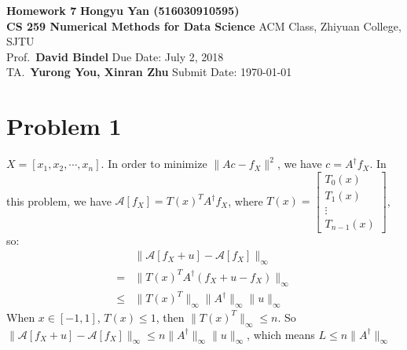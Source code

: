 \documentclass[a4paper, 11pt]{article}
\begin{document}
\noindent
\large\textbf{Homework 7} \hfill \textbf{Hongyu Yan (516030910595)} \\
\normalsize {\bf CS 259 Numerical Methods for Data Science} \hfill ACM Class, Zhiyuan College, SJTU\\
Prof.~{\bf David Bindel} \hfill Due Date: July 2, 2018\\
TA.~{\bf Yurong You, Xinran Zhu} \hfill Submit Date: \today

\section*{Problem 1}
$X = [x_1, x_2, \cdots, x_n]$. In order to minimize $\|Ac-f_X\|^2$,
we have $c=A^{\dagger}f_X$. In this problem, we have $\mathcal{A}[f_X]=T(x)^TA^{\dagger}f_X$, where $T(x) = \begin{bmatrix}
T_0(x) \\
T_1(x) \\
\vdots \\
T_{n-1}(x)
\end{bmatrix}$, so:
\begin{align*}
& \|\mathcal{A}[f_X+u]-\mathcal{A}[f_X]\|_{\infty} \\
= &\|T(x)^TA^{\dagger}(f_X+u-f_X)\|_{\infty} \\
\leq & \| T(x)^T\|_{\infty}\|A^{\dagger}\|_{\infty}\|u\|_{\infty}
\end{align*}
When $x \in [-1,1]$, $T(x) \leq 1$, then $\|T(x)^T\|_{\infty} \leq n$. So $\| \mathcal{A}[f_X+u]-\mathcal{A}[f_X]\|_{\infty} \leq n\|A^{\dagger}\|_{\infty}\|u\|_{\infty}$, which means $L \leq n\|A^{\dagger}\|_{\infty}$
\end{document}
